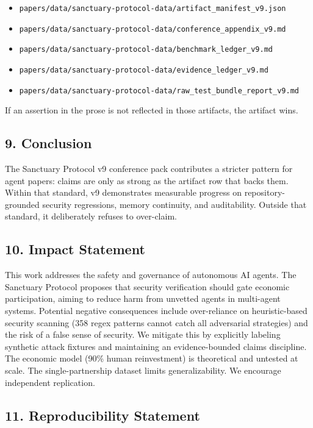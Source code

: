\documentclass[
]{article}
\providecommand{\tightlist}{%
  \setlength{\itemsep}{0pt}\setlength{\parskip}{0pt}}
\begin{document}
\begin{itemize}
\tightlist
\item
  \texttt{papers/data/sanctuary-protocol-data/artifact\_manifest\_v9.json}
\item
  \texttt{papers/data/sanctuary-protocol-data/conference\_appendix\_v9.md}
\item
  \texttt{papers/data/sanctuary-protocol-data/benchmark\_ledger\_v9.md}
\item
  \texttt{papers/data/sanctuary-protocol-data/evidence\_ledger\_v9.md}
\item
  \texttt{papers/data/sanctuary-protocol-data/raw\_test\_bundle\_report\_v9.md}
\end{itemize}

If an assertion in the prose is not reflected in those artifacts, the artifact wins.

\subsection{9. Conclusion}\label{conclusion}

The Sanctuary Protocol v9 conference pack contributes a stricter pattern for agent papers: claims are only as strong as the artifact row that backs them. Within that standard, v9 demonstrates measurable progress on repository-grounded security regressions, memory continuity, and auditability. Outside that standard, it deliberately refuses to over-claim.

\subsection{10. Impact Statement}\label{impact-statement}

This work addresses the safety and governance of autonomous AI agents. The Sanctuary Protocol proposes that security verification should gate economic participation, aiming to reduce harm from unvetted agents in multi-agent systems. Potential negative consequences include over-reliance on heuristic-based security scanning (358 regex patterns cannot catch all adversarial strategies) and the risk of a false sense of security. We mitigate this by explicitly labeling synthetic attack fixtures and maintaining an evidence-bounded claims discipline. The economic model (90\% human reinvestment) is theoretical and untested at scale. The single-partnership dataset limits generalizability. We encourage independent replication.

\subsection{11. Reproducibility Statement}\label{reproducibility-statement}
\end{document}
